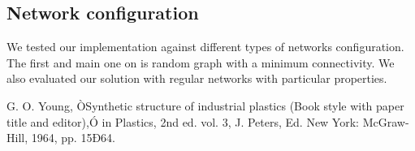 \documentclass[letterpaper, 10 pt, conference]{ieeeconf}  %
\begin{document}
\subsection{Network configuration}
We tested our implementation against different types of networks configuration. The first and main one on is random graph with a minimum connectivity.
We also evaluated our solution with regular networks with particular properties.




\begin{thebibliography}{99}

 G. O. Young, ÒSynthetic structure of industrial plastics (Book style with paper title and editor),Ó 	in Plastics, 2nd ed. vol. 3, J. Peters, Ed.  New York: McGraw-Hill, 1964, pp. 15Ð64.




\end{thebibliography}
\end{document}
